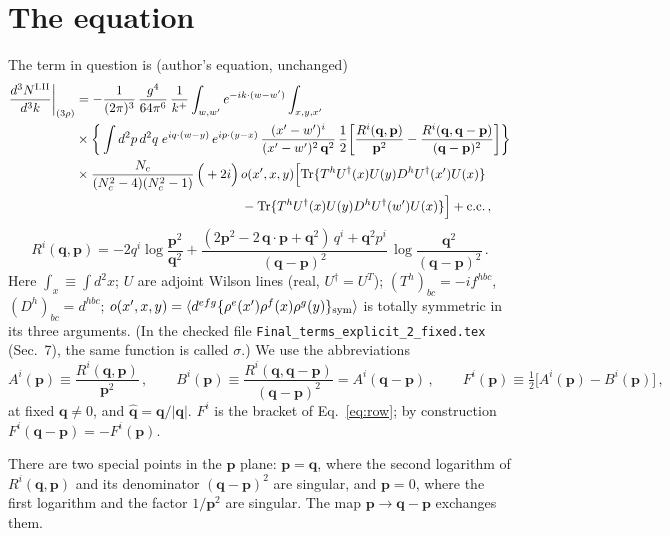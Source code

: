\documentclass[11pt]{article}
\newcommand{\vq}{\mathbf{q}}
\newcommand{\vp}{\mathbf{p}}
\newcommand{\qh}{\hat{\mathbf{q}}}
\newcommand{\Tr}{{\rm Tr}}
\begin{document}
\section{The equation}
The term in question is (author's equation, unchanged)
\begin{align}
\frac{d^{3}N^{\rm I.II}}{d^{3}k}\bigg|_{(3\rho)}&=-\frac{1}{(2\pi)^{3}}\,\frac{g^{4}}{64\pi^{6}}\,\frac{1}{k^{+}}\int_{w,w'}e^{-ik\cdot(w-w')}\int_{x,y,x'}\notag\\
&\times\bigg\{\int d^{2}p\,d^{2}q\;e^{iq\cdot(w-y)}\,e^{ip\cdot(y-x)}\,\frac{(x'-w')^{i}}{(x'-w')^{2}\,\mathbf{q}^{2}}\,\frac{1}{2}\bigg[\frac{R^{i}(\mathbf{q},\mathbf{p})}{\mathbf{p}^{2}}-\frac{R^{i}(\mathbf{q},\mathbf{q}-\mathbf{p})}{(\mathbf{q}-\mathbf{p})^{2}}\bigg]\bigg\}\notag\\
&\times \frac{N_{c}}{(N_{c}^{2}-4)(N_{c}^{2}-1)}\,\Big(+2i\Big)\,o(x',x,y)\Big[\Tr\{T^{h}U^{\dagger}(x)U(y)D^{h}U^{\dagger}(x')U(x)\}\notag\\
&\hspace{4.5cm}-\Tr\{T^{h}U^{\dagger}(x)U(y)D^{h}U^{\dagger}(w')U(x)\}\Big]+{\rm c.c.}\,,\label{eq:row}
\end{align}
\begin{equation}
R^{i}(\mathbf{q},\mathbf{p})  = -2q^{i}\log\frac{\mathbf{p}^{2}}{\mathbf{q}^{2}}+\frac{(2\mathbf{p}^{2}-2\,\mathbf{q}\cdot\mathbf{p}+\mathbf{q}^{2})\,q^{i}+\mathbf{q}^{2}p^{i}}{(\mathbf{q}-\mathbf{p})^{2}}\,\log\frac{\mathbf{q}^{2}}{(\mathbf{q}-\mathbf{p})^{2}}\,.\label{eq:R}
\end{equation}
Here $\int_{x}\equiv\int d^{2}x$; $U$ are adjoint Wilson lines (real, $U^{\dagger}=U^{T}$); $(T^{h})_{bc}=-if^{hbc}$, $(D^{h})_{bc}=d^{hbc}$; $o(x',x,y)=\langle d^{efg}\{\rho^{e}(x')\rho^{f}(x)\rho^{g}(y)\}_{\rm sym}\rangle$ is totally symmetric in its three arguments. (In the checked file \texttt{Final\_terms\_explicit\_2\_fixed.tex} (Sec.~7), the same function is called $\sigma$.) We use the abbreviations
\begin{equation}
A^{i}(\vp)\equiv\frac{R^{i}(\vq,\vp)}{\vp^{2}}\,,\qquad B^{i}(\vp)\equiv\frac{R^{i}(\vq,\vq-\vp)}{(\vq-\vp)^{2}}=A^{i}(\vq-\vp)\,,\qquad F^{i}(\vp)\equiv\tfrac12\big[A^{i}(\vp)-B^{i}(\vp)\big]\,,
\end{equation}
at fixed $\vq\neq0$, and $\qh=\vq/|\vq|$. $F^{i}$ is the bracket of Eq.~\eqref{eq:row}; by construction $F^{i}(\vq-\vp)=-F^{i}(\vp)$.

There are two special points in the $\vp$ plane: $\vp=\vq$, where the second logarithm of $R^{i}(\vq,\vp)$ and its denominator $(\vq-\vp)^{2}$ are singular, and $\vp=0$, where the first logarithm and the factor $1/\vp^{2}$ are singular. The map $\vp\to\vq-\vp$ exchanges them.
\end{document}
